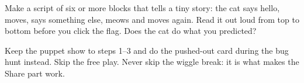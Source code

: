 \begin{stretchchallenge}
Make a script of six or more blocks that tells a tiny story: the cat says hello, moves, says something else, meows and moves again. Read it out loud from top to bottom before you click the flag. Does the cat do what you predicted?
\end{stretchchallenge}

\begin{teachernote}
Keep the puppet show to steps 1--3 and do the pushed-out card during the bug hunt instead. Skip the free play. Never skip the wiggle break: it is what makes the Share part work.
\end{teachernote}

